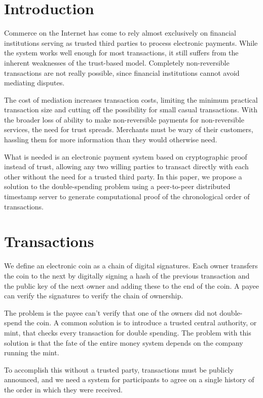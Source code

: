 \documentclass{article}
\begin{document}
\section{Introduction}

Commerce on the Internet has come to rely almost exclusively on financial institutions serving as trusted third parties to process electronic payments. While the system works well enough for most transactions, it still suffers from the inherent weaknesses of the trust-based model. Completely non-reversible transactions are not really possible, since financial institutions cannot avoid mediating disputes.

The cost of mediation increases transaction costs, limiting the minimum practical transaction size and cutting off the possibility for small casual transactions. With the broader loss of ability to make non-reversible payments for non-reversible services, the need for trust spreads. Merchants must be wary of their customers, hassling them for more information than they would otherwise need.

What is needed is an electronic payment system based on cryptographic proof instead of trust, allowing any two willing parties to transact directly with each other without the need for a trusted third party. In this paper, we propose a solution to the double-spending problem using a peer-to-peer distributed timestamp server to generate computational proof of the chronological order of transactions.

\section{Transactions}

We define an electronic coin as a chain of digital signatures. Each owner transfers the coin to the next by digitally signing a hash of the previous transaction and the public key of the next owner and adding these to the end of the coin. A payee can verify the signatures to verify the chain of ownership.

The problem is the payee can't verify that one of the owners did not double-spend the coin. A common solution is to introduce a trusted central authority, or mint, that checks every transaction for double spending. The problem with this solution is that the fate of the entire money system depends on the company running the mint.

To accomplish this without a trusted party, transactions must be publicly announced, and we need a system for participants to agree on a single history of the order in which they were received.
\end{document}

